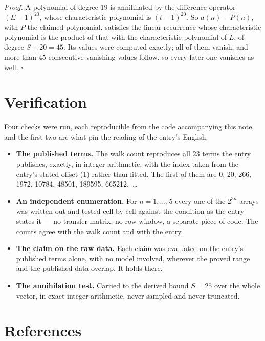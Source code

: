 \documentclass[11pt]{article}
\theoremstyle{definition}
\begin{document}
{\itshape Proof.} A polynomial of degree $19$ is annihilated by the difference operator $(E-1)^{20}$, whose characteristic polynomial is $(t-1)^{20}$. So $a(n) - P(n)$, with $P$ the claimed polynomial, satisfies the linear recurrence whose characteristic polynomial is the product of that with the characteristic polynomial of $L$, of degree $S + 20 = 45$. Its values were computed exactly; all of them vanish, and more than $45$ consecutive vanishing values follow, so every later one vanishes as well. $\square$

\section{Verification}

Four checks were run, each reproducible from the code accompanying this note, and the first two are what pin the reading of the entry's English.

\begin{itemize}

\item {\bfseries The published terms.} The walk count reproduces all 23 terms the entry publishes, exactly, in integer arithmetic, with the index taken from the entry's stated offset (1) rather than fitted. The first of them are 0, 20, 266, 1972, 10784, 48501, 189595, 665212,~\dots

\item {\bfseries An independent enumeration.} For $n = 1,\dots,5$ every one of the $2^{3n}$ arrays was written out and tested cell by cell against the condition as the entry states it --- no transfer matrix, no row window, a separate piece of code. The counts agree with the walk count and with the entry.

\item {\bfseries The claim on the raw data.} Each claim was evaluated on the entry's published terms alone, with no model involved, wherever the proved range and the published data overlap. It holds there.

\item {\bfseries The annihilation test.} Carried to the derived bound $S = 25$ over the whole vector, in exact integer arithmetic, never sampled and never truncated.

\end{itemize}

\section{References}
\end{document}
